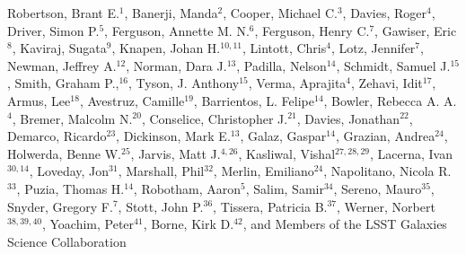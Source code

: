 Robertson, Brant E.$^{1}$, 
Banerji, Manda$^{2}$,
Cooper, Michael C.$^{3}$,
Davies, Roger$^{4}$,
Driver, Simon P.$^{5}$,
Ferguson, Annette M. N.$^{6}$,
Ferguson, Henry C.$^{7}$,
Gawiser, Eric$^{8}$,
Kaviraj, Sugata$^{9}$,
Knapen, Johan H.$^{10,11}$,
Lintott, Chris$^{4}$,
Lotz, Jennifer$^{7}$,
Newman, Jeffrey A.$^{12}$,
Norman, Dara J.$^{13}$,
Padilla, Nelson$^{14}$,
Schmidt, Samuel J.$^{15}$,
Smith, Graham P.,$^{16}$,
Tyson, J. Anthony$^{15}$,
Verma, Aprajita$^{4}$,
Zehavi, Idit$^{17}$,
Armus, Lee$^{18}$,
Avestruz, Camille$^{19}$,
Barrientos, L. Felipe$^{14}$,
Bowler, Rebecca A. A.$^{4}$,
Bremer, Malcolm N.$^{20}$,
Conselice, Christopher J.$^{21}$,
Davies, Jonathan$^{22}$,
Demarco, Ricardo$^{23}$,
Dickinson, Mark E.$^{13}$,
Galaz, Gaspar$^{14}$,
Grazian, Andrea$^{24}$,
Holwerda, Benne W.$^{25}$,
Jarvis, Matt J.$^{4,26}$,
Kasliwal, Vishal$^{27,28,29}$,
Lacerna, Ivan$^{30,14}$,
Loveday, Jon$^{31}$,
Marshall, Phil$^{32}$,
Merlin, Emiliano$^{24}$,
Napolitano, Nicola R.$^{33}$,
Puzia, Thomas H.$^{14}$,
Robotham, Aaron$^{5}$,
Salim, Samir$^{34}$,
Sereno, Mauro$^{35}$,
Snyder, Gregory F.$^{7}$,
Stott, John P.$^{36}$,
Tissera, Patricia B.$^{37}$,
Werner, Norbert$^{38,39,40}$,
Yoachim, Peter$^{41}$,
Borne, Kirk D.$^{42}$,
and Members of the LSST Galaxies Science Collaboration 


